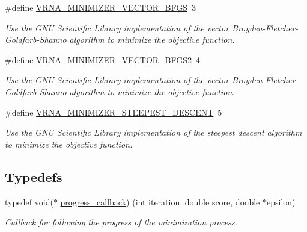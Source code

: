 \begin{DoxyCompactItemize}
\#define \mbox{\hyperlink{group__perturbation_ga9be8a702cddf58235571ace11cc41b22}{V\+R\+N\+A\+\_\+\+M\+I\+N\+I\+M\+I\+Z\+E\+R\+\_\+\+V\+E\+C\+T\+O\+R\+\_\+\+B\+F\+GS}}~3
\begin{DoxyCompactList}\small\item\em Use the G\+NU Scientific Library implementation of the vector Broyden-\/\+Fletcher-\/\+Goldfarb-\/\+Shanno algorithm to minimize the objective function. \end{DoxyCompactList}\item 
\#define \mbox{\hyperlink{group__perturbation_ga7b0a65c6c92fa1d8012383ba9d3dcb4f}{V\+R\+N\+A\+\_\+\+M\+I\+N\+I\+M\+I\+Z\+E\+R\+\_\+\+V\+E\+C\+T\+O\+R\+\_\+\+B\+F\+G\+S2}}~4
\begin{DoxyCompactList}\small\item\em Use the G\+NU Scientific Library implementation of the vector Broyden-\/\+Fletcher-\/\+Goldfarb-\/\+Shanno algorithm to minimize the objective function. \end{DoxyCompactList}\item 
\#define \mbox{\hyperlink{group__perturbation_ga9ecd2144c2ebed7533233da3986521b0}{V\+R\+N\+A\+\_\+\+M\+I\+N\+I\+M\+I\+Z\+E\+R\+\_\+\+S\+T\+E\+E\+P\+E\+S\+T\+\_\+\+D\+E\+S\+C\+E\+NT}}~5
\begin{DoxyCompactList}\small\item\em Use the G\+NU Scientific Library implementation of the steepest descent algorithm to minimize the objective function. \end{DoxyCompactList}\end{DoxyCompactItemize}
\subsection*{Typedefs}
\begin{DoxyCompactItemize}
\item 
typedef void($\ast$ \mbox{\hyperlink{group__perturbation_gaa715397c7afd2d2955c315512a3d571a}{progress\+\_\+callback}}) (int iteration, double score, double $\ast$epsilon)
\begin{DoxyCompactList}\small\item\em Callback for following the progress of the minimization process. \end{DoxyCompactList}\end{DoxyCompactItemize}
